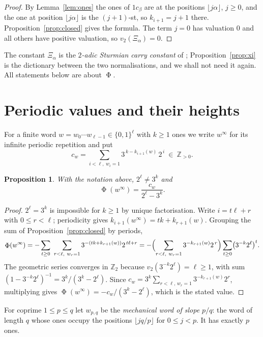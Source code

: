 \documentclass[11pt,reqno]{amsart}
\theoremstyle{plain}
\newtheorem{proposition}[theorem]{Proposition}
\theoremstyle{definition}
\newcommand{\Zt}{\mathbb{Z}_2}
\newcommand{\Z}{\mathbb{Z}}
\newcommand{\vt}{v_2}
\DeclareMathOperator{\Ph}{\Phi}
\begin{document}
\begin{proof}
By Lemma~\ref{lem:ones} the ones of $1c_\beta$ are at the positions $\lfloor
j\alpha\rfloor$, $j\ge0$, and the one at position $\lfloor j\alpha\rfloor$ is the
$(j+1)$-st, so $k_{i+1}=j+1$ there. Proposition~\ref{prop:closed} gives the
formula. The term $j=0$ has valuation $0$ and all others have positive
valuation, so $\vt(\Xi_\alpha)=0$.
\end{proof}

The constant $\Xi_\alpha$ is the \emph{$2$-adic Sturmian carry constant} of
\cite{DeJesusA}; Proposition~\ref{prop:xi} is the dictionary between the two
normalisations, and we shall not need it again. All statements below are about
$\Ph$.

\section{Periodic values and their heights}\label{sec:periodic}

For a finite word $w=w_0\cdots w_{\ell-1}\in\{0,1\}^{\ell}$ with $k\ge1$ ones we
write $w^\infty$ for its infinite periodic repetition and put
\begin{equation}\label{eq:cw}
c_w=\sum_{i<\ell,\ w_i=1}3^{\,k-k_{i+1}(w)}\,2^{\,i}\ \in\ \Z_{>0}.
\end{equation}

\begin{proposition}\label{prop:periodic}
With the notation above, $2^{\ell}\ne 3^{k}$ and
\[
\Ph(w^\infty)=\frac{c_w}{2^{\ell}-3^{k}}.
\]
\end{proposition}

\begin{proof}
$2^\ell=3^k$ is impossible for $k\ge1$ by unique factorisation. Write
$i=t\ell+r$ with $0\le r<\ell$; periodicity gives $k_{i+1}(w^\infty)=tk+k_{r+1}(w)$.
Grouping the sum of Proposition~\ref{prop:closed} by periods,
\[
\Ph(w^\infty)=-\sum_{t\ge0}\ \sum_{r<\ell,\ w_r=1}3^{-(tk+k_{r+1}(w))}2^{\,t\ell+r}
=-\Bigl(\sum_{r<\ell,\ w_r=1}3^{-k_{r+1}(w)}2^{\,r}\Bigr)\sum_{t\ge0}\bigl(3^{-k}2^{\ell}\bigr)^{t}.
\]
The geometric series converges in $\Zt$ because
$\vt(3^{-k}2^{\ell})=\ell\ge1$, with sum $(1-3^{-k}2^{\ell})^{-1}=3^{k}/(3^{k}-2^{\ell})$.
Since $c_w=3^{k}\sum_{r<\ell,\,w_r=1}3^{-k_{r+1}(w)}2^{r}$, multiplying gives
$\Ph(w^\infty)=-c_w/(3^{k}-2^{\ell})$, which is the stated value.
\end{proof}

For coprime $1\le p\le q$ let $w_{p,q}$ be the \emph{mechanical word of slope
$p/q$}: the word of length $q$ whose ones occupy the positions $\lfloor
jq/p\rfloor$ for $0\le j<p$. It has exactly $p$ ones.
\end{document}
